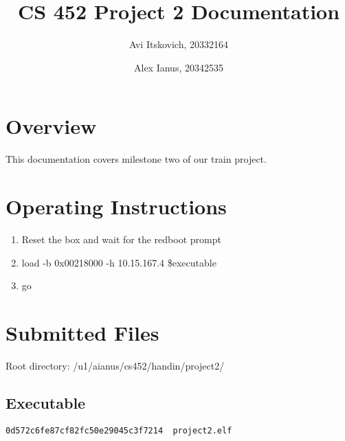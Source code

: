 \documentclass{article}
\title{CS 452 Project 2 Documentation}
\author{
  Avi Itskovich, 20332164
  \and
  Alex Ianus, 20342535
}
\begin{document}
\maketitle

\section{Overview}

This documentation covers milestone two of our train project.

\section{Operating Instructions}
\begin{enumerate}
  \item Reset the box and wait for the redboot prompt
  \item load -b 0x00218000 -h 10.15.167.4 \$executable
  \item go
\end{enumerate}

\section{Submitted Files}
Root directory: /u1/aianus/cs452/handin/project2/

\subsection{Executable}
\begin{verbatim}
0d572c6fe87cf82fc50e29045c3f7214  project2.elf
\end{verbatim}
\end{document}
